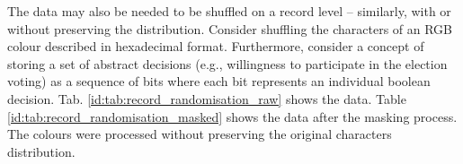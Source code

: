 \documentclass[a4paper,twoside,12pt]{book}
\begin{document}
The data may also be needed to be shuffled on a record level – similarly, with or without preserving the distribution.
%
Consider shuffling the characters of an RGB colour described in hexadecimal format. Furthermore, consider a concept of storing a set of abstract decisions (e.g., willingness to participate in the election voting) as a sequence of bits where each bit represents an individual boolean decision. Tab. \ref{id:tab:record_randomisation_raw} shows the data.
%
%
Table \ref{id:tab:record_randomisation_masked} shows the data after the masking process. The colours were processed without preserving the original characters distribution.
%
\end{document}
